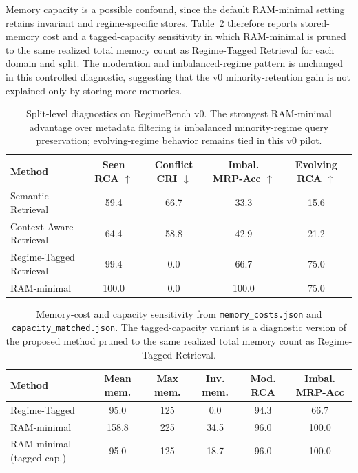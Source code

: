 \documentclass{article} %
\begin{document}
Memory capacity is a possible confound, since the default RAM-minimal setting retains invariant and regime-specific stores.
Table~\ref{tab:capacity_diagnostic} therefore reports stored-memory cost and a tagged-capacity sensitivity in which RAM-minimal is pruned to the same realized total memory count as Regime-Tagged Retrieval for each domain and split.
The moderation and imbalanced-regime pattern is unchanged in this controlled diagnostic, suggesting that the v0 minority-retention gain is not explained only by storing more memories.

\begin{table}[t]
\centering
\footnotesize
\begin{tabular}{lcccc}
\toprule
\textbf{Method} &
\textbf{Seen RCA $\uparrow$} &
\textbf{Conflict CRI $\downarrow$} &
\textbf{Imbal. MRP-Acc $\uparrow$} &
\textbf{Evolving RCA $\uparrow$} \\
\midrule
Semantic Retrieval & 59.4 & 66.7 & 33.3 & 15.6 \\
Context-Aware Retrieval & 64.4 & 58.8 & 42.9 & 21.2 \\
Regime-Tagged Retrieval & 99.4 & 0.0 & 66.7 & 75.0 \\
RAM-minimal & 100.0 & 0.0 & 100.0 & 75.0 \\
\bottomrule
\end{tabular}
\caption{Split-level diagnostics on RegimeBench v0. The strongest RAM-minimal advantage over metadata filtering is imbalanced minority-regime query preservation; evolving-regime behavior remains tied in this v0 pilot.}
\label{tab:split_results}
\end{table}

\begin{table}[t]
\centering
\scriptsize
\setlength{\tabcolsep}{4pt}
\begin{tabular}{@{}lccccc@{}}
\toprule
\textbf{Method} &
\textbf{Mean mem.} &
\textbf{Max mem.} &
\textbf{Inv. mem.} &
\textbf{Mod. RCA} &
\textbf{Imbal. MRP-Acc} \\
\midrule
Regime-Tagged & 95.0 & 125 & 0.0 & 94.3 & 66.7 \\
RAM-minimal & 158.8 & 225 & 34.5 & 96.0 & 100.0 \\
RAM-minimal (tagged cap.) & 95.0 & 125 & 18.7 & 96.0 & 100.0 \\
\bottomrule
\end{tabular}
\caption{Memory-cost and capacity sensitivity from \texttt{memory\_costs.json} and \texttt{capacity\_matched.json}. The tagged-capacity variant is a diagnostic version of the proposed method pruned to the same realized total memory count as Regime-Tagged Retrieval.}
\label{tab:capacity_diagnostic}
\end{table}
\end{document}

